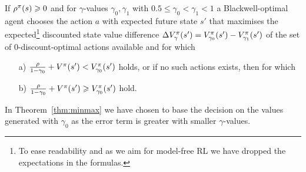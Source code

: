 \documentclass[envcountsame]{llncs}
\begin{document}
\begin{theorem}
  \label{thm:minmax}
  If \(\rho^{\pi}(s) \geqslant 0\) and for \(\gamma\)-values \(\gamma_{0}, \gamma_{1}\) with
  \(0.5 \leqslant \gamma_{0} < \gamma_{1} < 1\) a Blackwell-optimal agent chooses the action \(a\)
  with expected future state \(s'\) that maximises the expected\footnote{To ease readability and as
    we aim for model-free RL we have dropped the expectations in the formulas. } discounted state
  value difference
  \(\Delta V_{\gamma}^{\pi}(s') = V_{\gamma_{0}}^{\pi}(s') - V_{\gamma_{1}}^{\pi}(s')\) of the
  set of \(0\)-discount-optimal actions available and for which
  \begin{itemize}
  \item[a)] \(\frac{\rho}{1-\gamma_{0}} + V^{\pi}(s') < V_{\gamma_{0}}^{\pi}(s')\) holds, or if
    no such actions exists, then for which
  \item[b)]
    \(\frac{\rho}{1-\gamma_{0}} + V^{\pi}(s') \geqslant V_{\gamma_{0}}^{\pi}(s')\) hold.
  \end{itemize}

\end{theorem}

\begin{remark}
  In Theorem~\ref{thm:minmax} we have chosen to base the decision on the values generated with
  \(\gamma_{0}\) as the error term is greater with smaller \(\gamma\)-values.
\end{remark}
\end{document}
